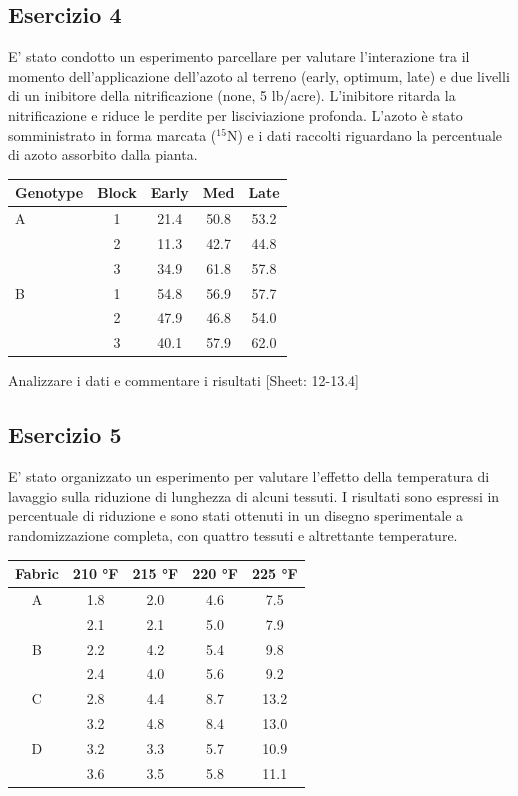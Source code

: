 \documentclass[a4paper,12pt,oneside]{book}
\begin{document}
\hypertarget{esercizio-4-6}{%
\subsection{Esercizio 4}\label{esercizio-4-6}}

E' stato condotto un esperimento parcellare per valutare l'interazione tra il momento dell'applicazione dell'azoto al terreno (early, optimum, late) e due livelli di un inibitore della nitrificazione (none, 5 lb/acre). L'inibitore ritarda la nitrificazione e riduce le perdite per lisciviazione profonda. L'azoto è stato somministrato in forma marcata (\(^{15}\)N) e i dati raccolti riguardano la percentuale di azoto assorbito dalla pianta.

\begin{longtable}[]{@{}lcccc@{}}
\toprule()
Genotype & Block & Early & Med & Late \\
\midrule()
\endhead
A & 1 & 21.4 & 50.8 & 53.2 \\
& 2 & 11.3 & 42.7 & 44.8 \\
& 3 & 34.9 & 61.8 & 57.8 \\
B & 1 & 54.8 & 56.9 & 57.7 \\
& 2 & 47.9 & 46.8 & 54.0 \\
& 3 & 40.1 & 57.9 & 62.0 \\
\bottomrule()
\end{longtable}

Analizzare i dati e commentare i risultati
{[}Sheet: 12-13.4{]}

\hypertarget{esercizio-5-5}{%
\subsection{Esercizio 5}\label{esercizio-5-5}}

E' stato organizzato un esperimento per valutare l'effetto della temperatura di lavaggio sulla riduzione di lunghezza di alcuni tessuti. I risultati sono espressi in percentuale di riduzione e sono stati ottenuti in un disegno sperimentale a randomizzazione completa, con quattro tessuti e altrettante temperature.

\begin{longtable}[]{@{}ccccc@{}}
\toprule()
Fabric & 210 °F & 215 °F & 220 °F & 225 °F \\
\midrule()
\endhead
A & 1.8 & 2.0 & 4.6 & 7.5 \\
& 2.1 & 2.1 & 5.0 & 7.9 \\
B & 2.2 & 4.2 & 5.4 & 9.8 \\
& 2.4 & 4.0 & 5.6 & 9.2 \\
C & 2.8 & 4.4 & 8.7 & 13.2 \\
& 3.2 & 4.8 & 8.4 & 13.0 \\
D & 3.2 & 3.3 & 5.7 & 10.9 \\
& 3.6 & 3.5 & 5.8 & 11.1 \\
\bottomrule()
\end{longtable}
\end{document}
